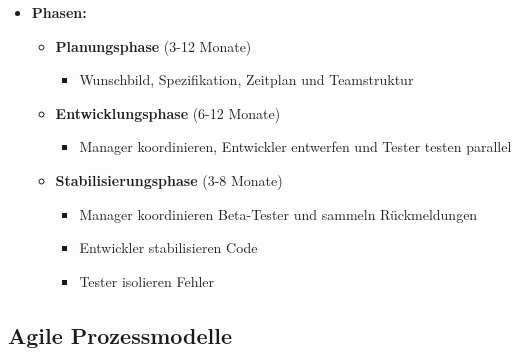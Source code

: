 \begin{itemize}
\newpage
\begin{itemize}			
\item \textbf{Phasen:}
\begin{itemize}
\item \textbf{Planungsphase} (3-12 Monate)
\begin{itemize}
\item Wunschbild, Spezifikation, Zeitplan und Teamstruktur
\end{itemize}
\item \textbf{Entwicklungsphase} (6-12 Monate)
\begin{itemize}
\item Manager koordinieren, Entwickler entwerfen und Tester testen parallel
\end{itemize}
\item \textbf{Stabilisierungsphase} (3-8 Monate)
\begin{itemize}
\item Manager koordinieren Beta-Tester und sammeln Rückmeldungen
\item Entwickler stabilisieren Code
\item Tester isolieren Fehler
\end{itemize}
\end{itemize}
\end{itemize}
\end{itemize}
					
\begin{center}
\end{center}
	
\subsection{Agile Prozessmodelle}
	
